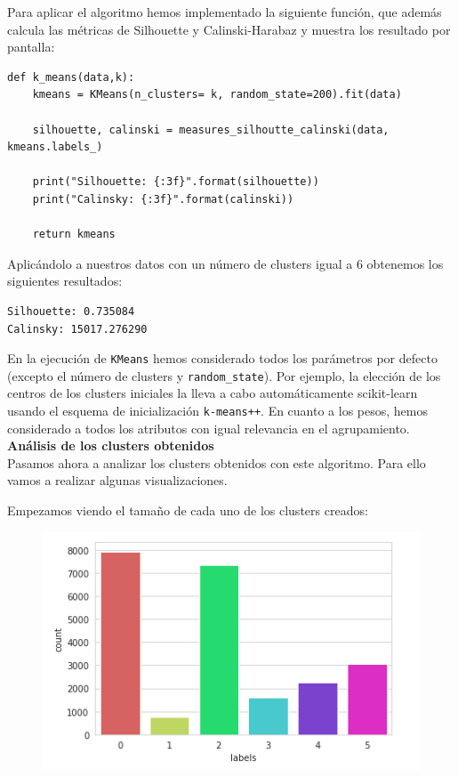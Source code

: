 \documentclass[a4paper,11pt]{book}
\begin{document}
Para aplicar el algoritmo hemos implementado la siguiente función, que además calcula las métricas de Silhouette y Calinski-Harabaz y muestra los resultado por pantalla:

\begin{verbatim}
def k_means(data,k):
	kmeans = KMeans(n_clusters= k, random_state=200).fit(data)
	
	silhouette, calinski = measures_silhoutte_calinski(data, kmeans.labels_)
	
	print("Silhouette: {:3f}".format(silhouette))
	print("Calinsky: {:3f}".format(calinski))
	
	return kmeans
\end{verbatim}
Aplicándolo a nuestros datos con un número de clusters igual a 6 obtenemos los siguientes resultados:
\begin{verbatim}
Silhouette: 0.735084
Calinsky: 15017.276290
\end{verbatim}

En la ejecución de \texttt{KMeans} hemos considerado todos los parámetros por defecto (excepto el número de clusters y \texttt{random_state}). Por ejemplo, la elección de los centros de los clusters iniciales la lleva a cabo automáticamente scikit-learn usando el esquema de inicialización \texttt{k-means++}. En cuanto a los pesos, hemos considerado a todos los atributos con igual relevancia en el agrupamiento.\\[0.1cm]

\textbf{Análisis de los clusters obtenidos}\\[0.05cm]

Pasamos ahora a analizar los clusters obtenidos con este algoritmo. Para ello vamos a realizar algunas visualizaciones. 

Empezamos viendo el tamaño de cada uno de los clusters creados: 
\vspace{3cm}

\begin{figure}[h]
	\centering
	\includegraphics[width=0.5\linewidth]{img/count1}
	\caption{}
	\label{fig:count1}
\end{figure} 
\end{document}
